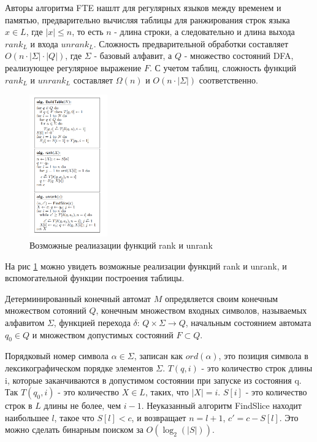 Авторы алгоритма FTE нашлт для регулярных языков между временем и памятью,
предварительно вычисляя таблицы для ранжирования строк языка $x \in L$, где $|x| \leq n$,
то есть $n$ - длина строки, а следовательно и длина выхода $rank_{L}$ и входа $unrank_{L}$.
Сложность предварительной обработки составляет $O(n \cdot |\Sigma| \cdot |Q|)$, где $\Sigma$ - базовый алфавит,
а $Q$ - множество состояний DFA, реализующее регулярное выражение $F$.
С учетом таблиц, сложность функций $rank_{L}$ и $unrank_{L}$ составляет $\Omega(n)$ и $O(n \cdot |\Sigma|)$ соответственно.

\begin{figure}[h!]
    \begin{center}
        \includegraphics[width = 0.3\textwidth]{algos.png}
        \caption{Возможные реалиазации функций rank и unrank}
        \label{algos}
    \end{center}
\end{figure}

На рис \ref{algos} можно увидеть возможные реализации функций rank и unrank, и вспомогательной функции построения таблицы.

Детерминированный конечный автомат $M$ опредяляется своим конечным множеством сотояний $Q$,
конечным множеством входных символов, называемых алфавитом $\Sigma$, функцией перехода $\delta$: $Q \times \Sigma \rightarrow Q$,
начальным состоянием автомата $q_0 \in Q$ и множеством допустимых состояний $F \subset Q$.

Порядковый номер символа $\alpha \in \Sigma$, записан как $ord(\alpha)$, это позиция символа в лексикографическом порядке элементов $\Sigma$.
$T(q, i)$ - это количество строк длины i, которые заканчиваются в допустимом состоянии при запуске из состояния q.
Так $T(q_0, i)$ - это количество $X \in L$, таких, что $|X| = i$.
$S[i]$ - это количество строк в $L$ длины не более, чем $i - 1$.
Неуказанный алгоритм FindSlice находит наибольшее $l$, такое что $S[l] < c$, и возвращает $n = l + 1$, $c' = c - S[l]$.
Это можно сделать бинарным поиском за $O(\log_2(|S|))$.


